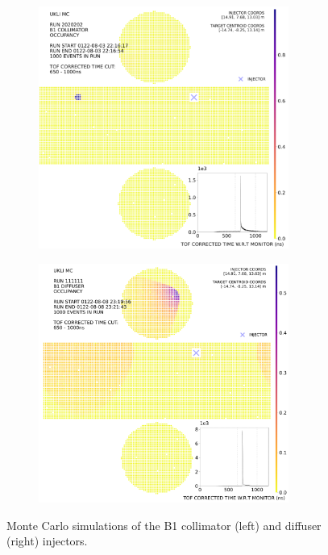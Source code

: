 \begin{figure}[htp]
    \begin{subfigure}{0.49\columnwidth}
    \centering
    \includegraphics[width=0.9\textwidth]{Figures/ukli_mc_B1.PNG}
    \label{fig:ukli_mc_coll}
    \end{subfigure}\hfill
    \begin{subfigure}{0.49\columnwidth}
    \centering
    \includegraphics[width=0.9\textwidth]{Figures/ukli_diff_mc_B1.PNG}
    \label{fig:ukli_mc_diff}
    \end{subfigure}
    \caption{Monte Carlo simulations of the B1 collimator (left) and diffuser (right) injectors.}
    \label{fig:ukli_mc_diff_coll}
\end{figure}

